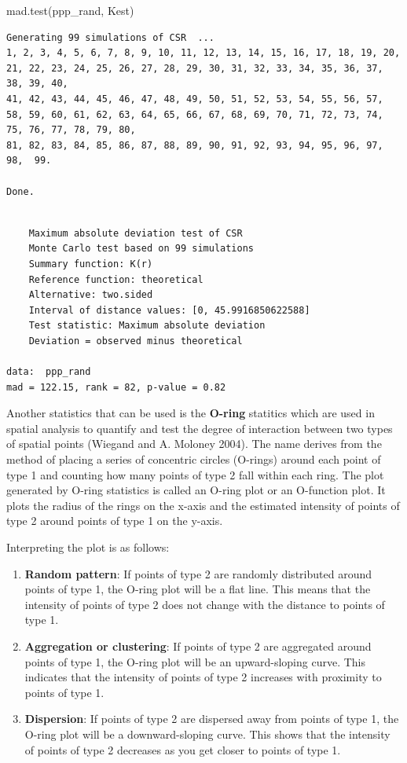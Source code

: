 \documentclass[
  letterpaper,
  DIV=11,
  numbers=noendperiod]{scrreprt}
\newenvironment{Shaded}{\begin{snugshade}}{\end{snugshade}}
\newcommand{\FunctionTok}[1]{\textcolor[rgb]{0.28,0.35,0.67}{#1}}
\newcommand{\NormalTok}[1]{\textcolor[rgb]{0.00,0.23,0.31}{#1}}
\begin{document}
\begin{Shaded}
\begin{Highlighting}[]
\FunctionTok{mad.test}\NormalTok{(ppp\_rand, Kest)}
\end{Highlighting}
\end{Shaded}

\begin{verbatim}
Generating 99 simulations of CSR  ...
1, 2, 3, 4, 5, 6, 7, 8, 9, 10, 11, 12, 13, 14, 15, 16, 17, 18, 19, 20, 21, 22, 23, 24, 25, 26, 27, 28, 29, 30, 31, 32, 33, 34, 35, 36, 37, 38, 39, 40,
41, 42, 43, 44, 45, 46, 47, 48, 49, 50, 51, 52, 53, 54, 55, 56, 57, 58, 59, 60, 61, 62, 63, 64, 65, 66, 67, 68, 69, 70, 71, 72, 73, 74, 75, 76, 77, 78, 79, 80,
81, 82, 83, 84, 85, 86, 87, 88, 89, 90, 91, 92, 93, 94, 95, 96, 97, 98,  99.

Done.
\end{verbatim}

\begin{verbatim}

    Maximum absolute deviation test of CSR
    Monte Carlo test based on 99 simulations
    Summary function: K(r)
    Reference function: theoretical
    Alternative: two.sided
    Interval of distance values: [0, 45.9916850622588]
    Test statistic: Maximum absolute deviation
    Deviation = observed minus theoretical

data:  ppp_rand
mad = 122.15, rank = 82, p-value = 0.82
\end{verbatim}

Another statistics that can be used is the \textbf{O-ring} statitics
which are used in spatial analysis to quantify and test the degree of
interaction between two types of spatial points (Wiegand and A. Moloney
2004). The name derives from the method of placing a series of
concentric circles (O-rings) around each point of type 1 and counting
how many points of type 2 fall within each ring. The plot generated by
O-ring statistics is called an O-ring plot or an O-function plot. It
plots the radius of the rings on the x-axis and the estimated intensity
of points of type 2 around points of type 1 on the y-axis.

Interpreting the plot is as follows:

\begin{enumerate}
\def\labelenumi{\arabic{enumi}.}
\item
  \textbf{Random pattern}: If points of type 2 are randomly distributed
  around points of type 1, the O-ring plot will be a flat line. This
  means that the intensity of points of type 2 does not change with the
  distance to points of type 1.
\item
  \textbf{Aggregation or clustering}: If points of type 2 are aggregated
  around points of type 1, the O-ring plot will be an upward-sloping
  curve. This indicates that the intensity of points of type 2 increases
  with proximity to points of type 1.
\item
  \textbf{Dispersion}: If points of type 2 are dispersed away from
  points of type 1, the O-ring plot will be a downward-sloping curve.
  This shows that the intensity of points of type 2 decreases as you get
  closer to points of type 1.
\end{enumerate}
\end{document}
